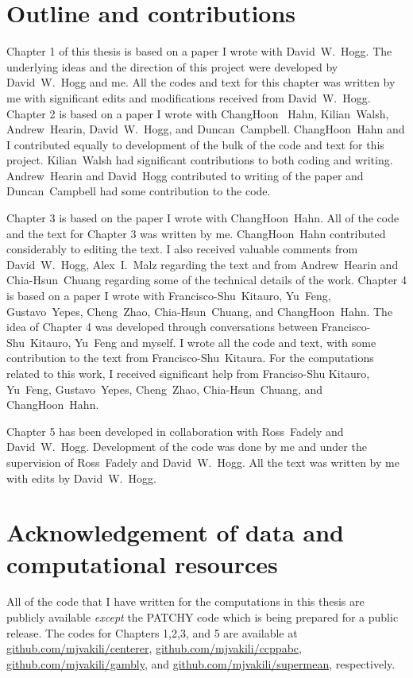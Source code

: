 \section{Outline and contributions}

Chapter 1 of this thesis is based on a paper I wrote with David~W.~Hogg. The underlying ideas and the direction of this project were developed by David~W.~Hogg and me. 
All the codes and text for this chapter was written by me with significant edits and modifications received from David~W.~Hogg. Chapter 2 is based on a paper I wrote with ChangHoon~ Hahn, Kilian~Walsh, Andrew~Hearin, David~W.~Hogg, and Duncan~Campbell. ChangHoon~Hahn and I contributed equally to development of the bulk of the code and text for this project. Kilian~Walsh had significant contributions to both coding and writing. Andrew~Hearin and David~Hogg contributed to writing of the paper and Duncan~Campbell had some contribution 
to the code. 

Chapter 3 is based on the paper I wrote with ChangHoon~Hahn. All of the code and the text for Chapter 3 was written by me. ChangHoon~Hahn contributed considerably to editing the text. I also received valuable comments from David~W.~Hogg, Alex~I.~Malz regarding the text and from Andrew~Hearin and Chia-Hsun~Chuang regarding some of the technical details of the work. Chapter 4 is based on a paper I wrote with Francisco-Shu~Kitauro, Yu~Feng, Gustavo~Yepes, Cheng~Zhao, Chia-Hsun~Chuang, and ChangHoon~Hahn. 
The idea of Chapter 4 was developed through conversations between Francisco-Shu~Kitauro, Yu~Feng and myself. I wrote all the code and text, with some contribution to the text from Francisco-Shu~Kitaura. For the computations related to this work, I received significant help from Franciso-Shu Kitauro, Yu~Feng, Gustavo~Yepes, Cheng~Zhao, Chia-Hsun~Chuang, and ChangHoon~Hahn. 

Chapter 5 has been developed in collaboration with Ross~Fadely and David~W.~Hogg. Development of the code was done by me and under the supervision of Ross~Fadely and David~W.~Hogg. All the text was written by me with edits by David~W.~Hogg.

\section{Acknowledgement of data and computational resources}

All of the code that I have written for the computations in this thesis are publicly available \emph{except} the PATCHY code which is being prepared for a public release. 
The codes for Chapters 1,2,3, and 5 are available at \url{github.com/mjvakili/centerer}, \url{github.com/mjvakili/ccppabc}, \url{github.com/mjvakili/gambly}, and \url{github.com/mjvakili/supermean}, respectively.


